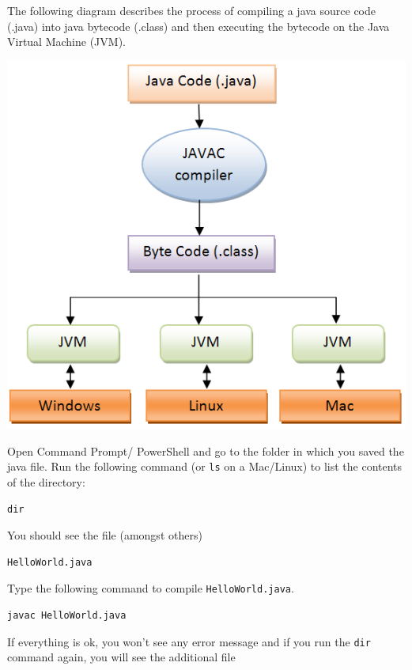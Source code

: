 \begin{questions}
The following diagram describes the process of compiling a java source code (.java) into java bytecode (.class) and then executing the bytecode on the Java Virtual Machine (JVM).
\vskip 0.5cm
\begin{center}
	\includegraphics[scale=0.3]{javaCompileExecute}
\end{center}
\vskip 0.5cm

Open Command Prompt/ PowerShell and go to the folder in which you saved the java file. Run the following command (or \texttt{ls} on a Mac/Linux) to list the contents of the directory:

\begin{lstlisting}[numbers=none]
dir
\end{lstlisting}

You should see the file (amongst others)

\begin{lstlisting}[numbers=none]
HelloWorld.java
\end{lstlisting}

Type the following command to compile \texttt{HelloWorld.java}. 

\begin{lstlisting}[numbers=none]
javac HelloWorld.java	
\end{lstlisting}

If everything is ok, you won't see any error message and if you run the \texttt{dir} command again, you will see the additional file


\end{questions}
